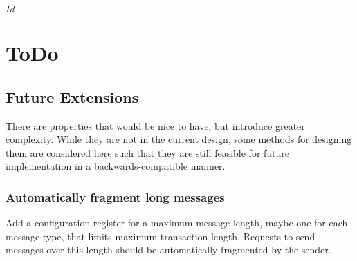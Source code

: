 \svnInfo $Id$

\section{ToDo}
\label{sec:todo}

\subsection{Future Extensions}
\label{sec:todo-extensions}
There are properties that would be nice to have, but introduce greater
complexity. While they are not in the current design, some methods for
designing them are considered here such that they are still feasible for
future implementation in a backwards-compatible manner.

\subsubsection{Automatically fragment long \proto messages}
Add a configuration register for a maximum message length, maybe one for each
message type, that limits maximum transaction length. Requests to send
messages over this length should be automatically fragmented by the sender.
